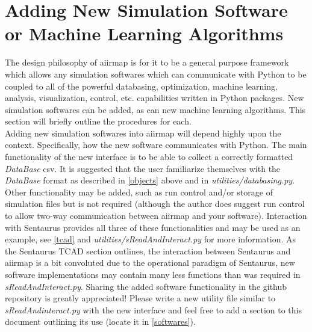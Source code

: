 \documentclass[a4paper,12pt,english]{article}
\begin{document}
    
    
    \section{Adding New Simulation Software or Machine Learning Algorithms } \label{new}
    The design philosophy of aiirmap is for it to be a general purpose framework which allows any simulation softwares which can communicate with Python to be coupled to all of the powerful databasing, optimization, machine learning, analysis, visualization, control, etc. capabilities written in Python packages. New simulation softwares can be added, as can new machine learning algorithms. This section will briefly outline the procedures for each.\\

    Adding new simulation softwares into aiirmap will depend highly upon the context. Specifically, how the new software communicates with Python. The main functionality of the new interface is to be able to collect a correctly formatted \textit{DataBase} csv. It is suggested that the user familiarize themselves with the \textit{DataBase} format as described in \autoref{objects} above and in \textit{utilities/databasing.py}. Other functionality may be added, such as run control and/or storage of simulation files but is not required (although the author does suggest run control to allow two-way communication between aiirmap and your software). Interaction with Sentaurus provides all three of these functionalities and may be used as an example, see \autoref{tcad} and \textit{utilities/sReadAndInteract.py} for more information. As the Sentaurus TCAD section outlines, the interaction between Sentaurus and aiirmap is a bit convoluted due to the operational paradigm of Sentaurus, new software implementations may contain many less functions than was required in \textit{sReadAndInteract.py}. Sharing the added software functionality in the github repository is greatly appreciated! Please write a new utility file similar to \textit{sReadAndinteract.py} with the new interface and feel free to add a section to this document outlining its use (locate it in \autoref{softwares}). \\
\end{document}
